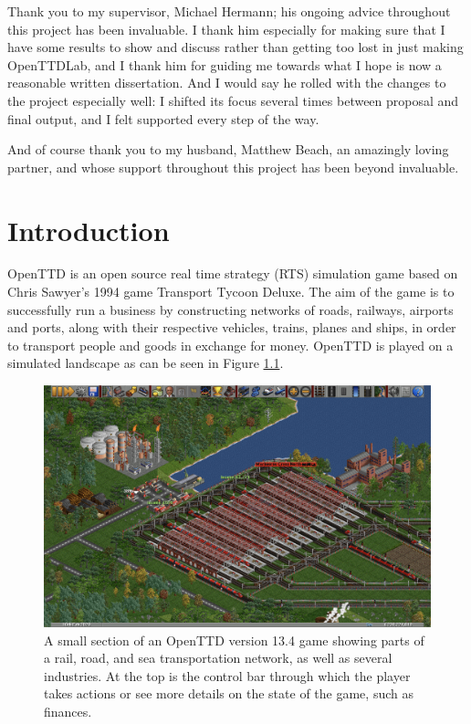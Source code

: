 \documentclass[logo,msc,dsti]{style/infthesis}    %
\begin{document}
\begin{preliminary}
\begin{acknowledgements}
Thank you to my supervisor, Michael Hermann; his ongoing advice throughout this project has been invaluable. I thank him especially for making sure that I have some results to show and discuss rather than getting too lost in just making OpenTTDLab, and I thank him for guiding me towards what I hope is now a reasonable written dissertation. And I would say he rolled with the changes to the project especially well: I shifted its focus several times between proposal and final output, and I felt supported every step of the way.

And of course thank you to my husband, Matthew Beach, an amazingly loving partner, and whose support throughout this project has been beyond invaluable.

\end{acknowledgements}

\tableofcontents

\end{preliminary}


\chapter{Introduction}
\label{chapter:introduction}

OpenTTD \cite{openttd} is an open source real time strategy (RTS) simulation game based on  Chris Sawyer's 1994 game Transport Tycoon Deluxe. The aim of the game is to successfully run a business by constructing networks of roads, railways, airports and ports, along with their respective vehicles, trains, planes and ships, in order to transport people and goods in exchange for money. OpenTTD is played on a simulated landscape as can be seen in Figure \ref{figure:introduction-screenshot}.

\begin{figure}[ht]
\centering
\includegraphics[width=\columnwidth]{assets/openttd_screenshot.png}
\caption{A small section of an OpenTTD version 13.4 game showing parts of a rail, road, and sea transportation network, as well as several industries. At the top is the control bar through which the player takes actions or see more details on the state of the game, such as finances.}
\label{figure:introduction-screenshot}
\end{figure}
\end{document}
